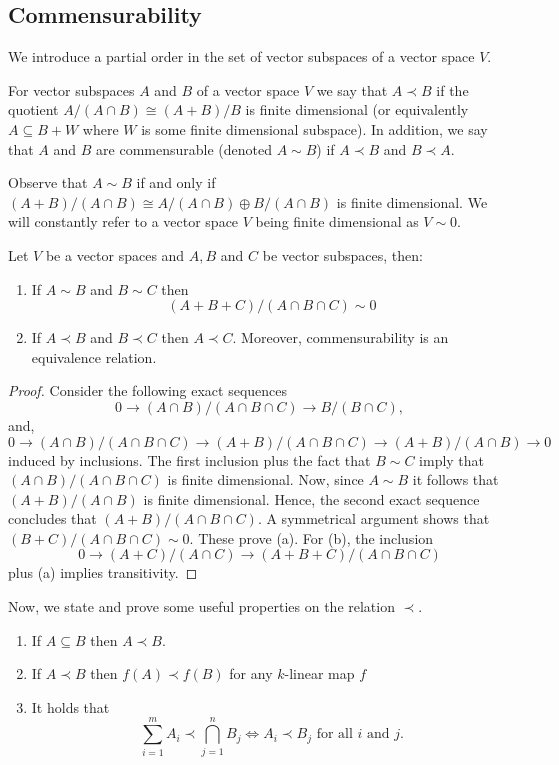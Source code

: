 \subsection*{Commensurability}
We introduce a partial order in the set of vector subspaces of a vector space $V$.
\begin{definition}\label{def:commensurability}
	For vector subspaces $A$ and $B$ of a vector space $V$ we say that $A \prec B$ if the quotient $A/(A\cap B) \cong (A+B)/B$ is finite dimensional (or equivalently $A \subseteq B + W$ where $W$ is some finite dimensional subspace). In addition, we say that $A$ and $B$ are commensurable (denoted $A \sim B$) if $A \prec B$ and $B \prec A$.
\end{definition}
Observe that $A \sim B$ if and only if $(A+B)/(A\cap B) \cong A/(A\cap B) \oplus B/(A \cap B)$ is finite dimensional. We will constantly refer to a vector space $V$ being finite dimensional as $V \sim 0$.
\begin{proposition}\label{prop:equivalence-relation}
	Let $V$ be a vector spaces and $A,B$ and $C$ be vector subspaces, then:
	\begin{enumerate}[label = (\alph*)]
		\item If $A \sim B$ and $B \sim C$ then
		\[
			(A+B+C)/(A \cap B \cap C) \sim 0
		\]
		\item If $A \prec B$ and $B \prec C$ then $A \prec C$. Moreover, commensurability is an equivalence relation.
	\end{enumerate}
\end{proposition}
\begin{proof}
	Consider the following exact sequences
	\[
		0 \to (A\cap B)/(A \cap B \cap C) \to B/(B \cap C), 
	\]
	and,
	\[
		0 \to (A\cap B)/(A \cap B \cap C) \to (A+B)/(A \cap B \cap C) \to (A+B)/(A \cap B) \to 0
	\]
	induced by inclusions. The first inclusion plus the fact that $B \sim C$ imply that $(A\cap B)/(A \cap B \cap C)$ is finite dimensional. Now, since $A \sim B$ it follows that $(A+B)/(A \cap B)$ is finite dimensional. Hence, the second exact sequence concludes that $(A+B)/(A \cap B \cap C)$. A symmetrical argument shows that $(B+C)/(A \cap B \cap C) \sim 0$. These prove (a). For (b), the inclusion
	\[
		0 \to (A+C)/(A\cap C) \to (A+B+C)/(A \cap B \cap C)
	\]
	plus (a) implies transitivity. 
\end{proof}
Now, we state and prove some useful properties on the relation $\prec$.
\begin{lemma}\label{lemm:properties-order-well-behaved-under-operations}
\begin{enumerate}[label = (\alph*)]
	\item If $A \subseteq B$ then $A \prec B$.
	\item If $A \prec B$ then $f(A) \prec f(B)$ for any $k$-linear map $f$
	\item It holds that
	\[
		\sum_{i=1}^{m} A_{i} \prec \bigcap_{j=1}^{n} B_{j} \iff A_{i} \prec B_{j}\text{ for all } i \text{ and } j.
	\]
\end{enumerate}
\end{lemma}
